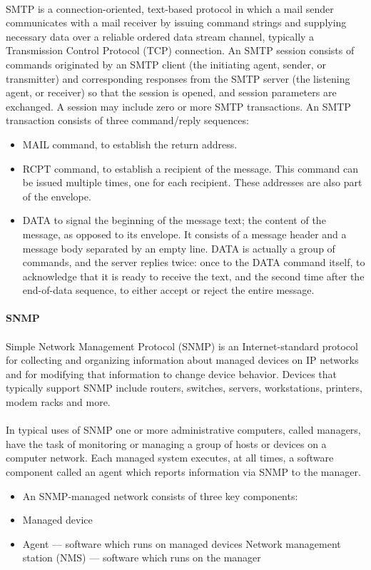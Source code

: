 \paragraph{}
SMTP is a connection-oriented, text-based protocol in which a mail sender communicates with a mail receiver by issuing command strings and supplying necessary data over a reliable ordered data stream channel, typically a Transmission Control Protocol (TCP) connection. An SMTP session consists of commands originated by an SMTP client (the initiating agent, sender, or transmitter) and corresponding responses from the SMTP server (the listening agent, or receiver) so that the session is opened, and session parameters are exchanged. A session may include zero or more SMTP transactions. An SMTP transaction consists of three command/reply sequences:
\begin{itemize}
\item MAIL command, to establish the return address.
\item RCPT command, to establish a recipient of the message. This command can be issued multiple times, one for each recipient. These addresses are also part of the envelope.
\item DATA to signal the beginning of the message text; the content of the message, as opposed to its envelope. It consists of a message header and a message body separated by an empty line. DATA is actually a group of commands, and the server replies twice: once to the DATA command itself, to acknowledge that it is ready to receive the text, and the second time after the end-of-data sequence, to either accept or reject the entire message.
\end{itemize}

\paragraph{} \textbf{SNMP}
\paragraph{} 
Simple Network Management Protocol (SNMP) is an Internet-standard protocol for collecting and organizing information about managed devices on IP networks and for modifying that information to change device behavior. Devices that typically support SNMP include routers, switches, servers, workstations, printers, modem racks and more.
\paragraph{}
In typical uses of SNMP one or more administrative computers, called managers, have the task of monitoring or managing a group of hosts or devices on a computer network. Each managed system executes, at all times, a software component called an agent which reports information via SNMP to the manager.
\begin{itemize}
\item An SNMP-managed network consists of three key components:
\item Managed device
\item Agent — software which runs on managed devices
Network management station (NMS) — software which runs on the manager
\end{itemize}
